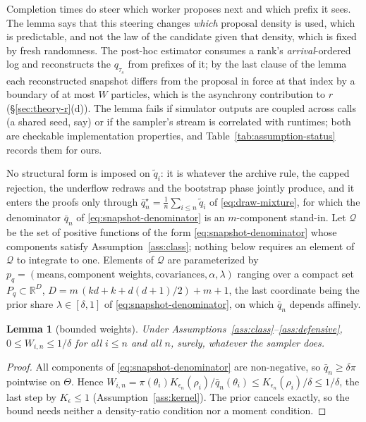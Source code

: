 \documentclass[10pt]{article}
\theoremstyle{plain}
\newtheorem{lemma}[theorem]{Lemma}
\theoremstyle{definition}
\begin{document}
Completion times do steer which worker proposes next and which prefix it sees. The lemma says that this steering changes \emph{which} proposal density is used, which is predictable, and not the law of the candidate given that density, which is fixed by fresh randomness. The post-hoc estimator consumes a rank's \emph{arrival}-ordered log and reconstructs the $q_{\tau_s}$ from prefixes of it; by the last clause of the lemma each reconstructed snapshot differs from the proposal in force at that index by a boundary of at most $W$ particles, which is the asynchrony contribution to $r$ (\S\ref{sec:theory-r}(d)). The lemma fails if simulator outputs are coupled across calls (a shared seed, say) or if the sampler's stream is correlated with runtimes; both are checkable implementation properties, and Table~\ref{tab:assumption-status} records them for ours.

No structural form is imposed on $\tilde q_i$: it is whatever the archive rule, the capped rejection, the underflow redraws and the bootstrap phase jointly produce, and it enters the proofs only through $\bar q^\star_n=\tfrac1n\sum_{i\le n}\tilde q_i$ of \eqref{eq:draw-mixture}, for which the denominator $\bar q_n$ of \eqref{eq:snapshot-denominator} is an $m$-component stand-in. Let $\mathcal{Q}$ be the set of positive functions of the form \eqref{eq:snapshot-denominator} whose components satisfy Assumption~\ref{ass:class}; nothing below requires an element of $\mathcal{Q}$ to integrate to one. Elements of $\mathcal{Q}$ are parameterized by $p_q=(\text{means},\text{component weights},\text{covariances},\alpha,\lambda)$ ranging over a compact set $P_q\subset\mathbb{R}^{D}$, $D=m\,(kd+k+d(d+1)/2)+m+1$, the last coordinate being the prior share $\lambda\in[\delta,1]$ of \eqref{eq:snapshot-denominator}, on which $\bar q_n$ depends affinely.

\begin{lemma}[bounded weights]\label{lem:bounded}
Under Assumptions~\ref{ass:class}--\ref{ass:defensive}, $0\le W_{i,n}\le1/\delta$ for all $i\le n$ and all $n$, surely, whatever the sampler does.
\end{lemma}
\begin{proof}
All components of \eqref{eq:snapshot-denominator} are non-negative, so $\bar q_n\ge\delta\pi$ pointwise on $\Theta$. Hence $W_{i,n}=\pi(\theta_i)K_{\epsilon_n}(\rho_i)/\bar q_n(\theta_i)\le K_{\epsilon_n}(\rho_i)/\delta\le1/\delta$, the last step by $K_\epsilon\le1$ (Assumption~\ref{ass:kernel}). The prior cancels exactly, so the bound needs neither a density-ratio condition nor a moment condition.
\end{proof}
\end{document}
